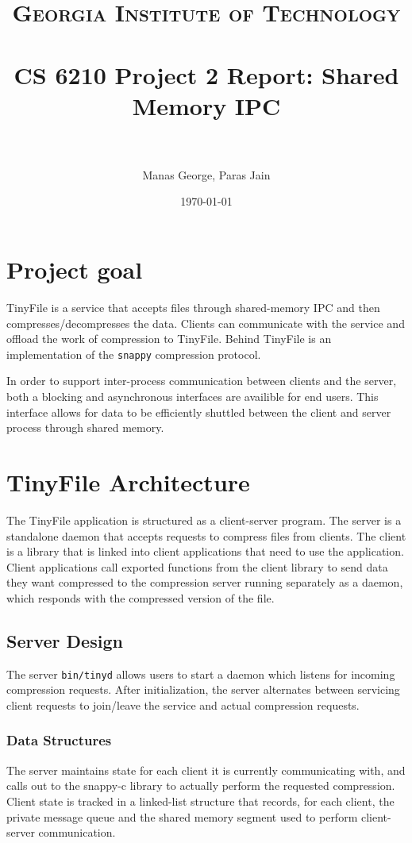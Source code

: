 \documentclass[paper=a4,fontsize=11pt]{report} %
\title{	
\normalfont \normalsize 
\textsc{Georgia Institute of Technology} \\ [25pt] %
\horrule{0.5pt} \\[0.4cm] %
\huge CS 6210 Project 2 Report: Shared Memory IPC \\ %
\horrule{2pt} \\[0.5cm] %
}
\author{Manas George, Paras Jain} %
\date{\normalsize\today} %
\numberwithin{equation}{section} %
\numberwithin{figure}{section} %
\numberwithin{table}{section} %
\begin{document}
\maketitle %

\section{Project goal}
TinyFile is a service that accepts files through shared-memory IPC and then compresses/decompresses the data. Clients can communicate with the service and offload the work of compression to TinyFile. Behind TinyFile is an implementation of the \texttt{snappy} compression protocol.

In order to support inter-process communication between clients and the server, both a blocking and asynchronous interfaces are availible for end users. This interface allows for data to be efficiently shuttled between the client and server process through shared memory.

\section{TinyFile Architecture}
The TinyFile application is structured as a client-server program. The server is a standalone daemon that accepts requests to compress files from clients. The client is a library that is linked into client applications that need to use the application. Client applications call exported functions from the client library to send data they want compressed to the compression server running separately as a daemon, which responds with the compressed version of the file.

\subsection{Server Design}
The server \texttt{bin/tinyd} allows users to start a daemon which listens for incoming compression requests. After initialization, the server alternates between servicing client requests to join/leave the service and actual compression requests.

\subsubsection{Data Structures}
The server maintains state for each client it is currently communicating with, and calls out to the snappy-c library to actually perform the requested compression. Client state is tracked in a linked-list structure that records, for each client, the private message queue and the shared memory segment used to perform client-server communication.
\end{document}
